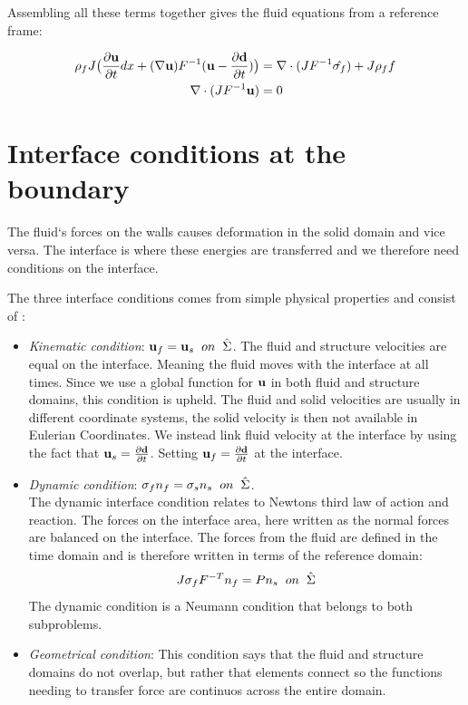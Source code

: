 Assembling all these terms together gives the fluid equations from a reference frame:

\begin{align}
\label{eq:NS_mapped}
\rho_f J \big( \frac{\partial \bold{u}}{\partial t} dx + (\nabla \bold{u})F^{-1}(\bold{u}-\frac{\partial \bold{d}}{\partial t}) \big) &= \nabla \cdot( J F^{-1} \hat{\sigma_f} ) + J \rho_f f \\
\nabla \cdot (J F^{-1} \bold{u} ) &= 0
\end{align} 



\section{Interface conditions at the boundary}
The fluid`s forces on the walls causes deformation in the solid domain and vice versa. The interface is where these energies are transferred and we therefore need conditions on the interface. \newline

The three interface conditions comes from simple physical properties and consist of \cite{Richter2016}:
\begin{itemize}
\item \textit{Kinematic condition}: $\bold{u}_f = \bold{u}_s  \hspace{2mm} on \hspace{2mm} \hat{\Sigma}$. The fluid and structure velocities are equal on the interface. Meaning the fluid moves with the interface at all times. 
Since we use a global function for $\bold{u}$ in both fluid and structure domains, this condition is upheld.
The fluid and solid velocities are usually in different coordinate systems, the solid velocity is then not available in Eulerian Coordinates. We instead link fluid velocity at the interface by using the fact that $\bold{u}_s = \frac{\partial \bold{d}}{\partial t}$. Setting $\bold{u}_f = \frac{\partial \bold{d}}{\partial t}$ at the interface.

\item \textit{Dynamic condition}: $  \sigma_f n_f = \sigma_s n_s \hspace{2mm} on  \hspace{2mm}\hat{\Sigma}   $. \\
	The dynamic interface condition relates to Newtons third law of action and reaction. The forces on the interface area, here written as the normal forces are balanced on the interface. The forces from the fluid are defined in the time domain and is therefore written in terms of the reference domain: 
	$$J\sigma_f F^{-T} n_f = P n_s \hspace{2mm} on  \hspace{2mm}\hat{\Sigma} $$
	The dynamic condition is a Neumann condition that belongs to both subproblems.
	
\item \textit{Geometrical condition}: This condition says that the fluid and structure domains do not overlap, but rather that elements connect so the functions needing to transfer force are continuos across the entire domain.
\end{itemize}

